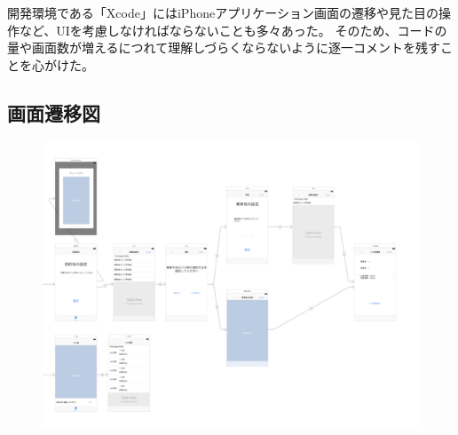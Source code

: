\documentclass[openany,11pt,papersize]{jsbook}
\begin{document}
開発環境である「Xcode」にはiPhoneアプリケーション画面の遷移や見た目の操作など、UIを考慮しなければならないことも多々あった。
そのため、コードの量や画面数が増えるにつれて理解しづらくならないように逐一コメントを残すことを心がけた。



  \begin{appendix}

\chapter{画面遷移図}
\begin{figure}[htbp]
  \begin{center}
    \includegraphics[clip,width=19cm,angle=90]{img/picture.png}
    \label{fig:senni}
  \end{center}
\end{figure}


\end{appendix}
\end{document}
